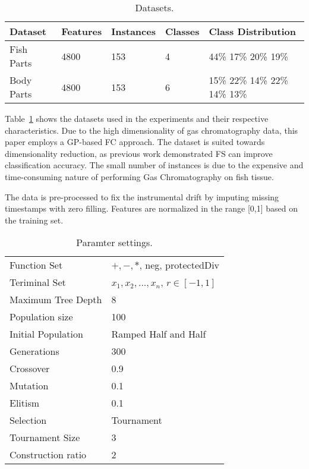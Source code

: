 \documentclass[runningheads]{llncs}
\begin{document}
\begin{table}
  \caption{Datasets.}
  \centering 
  \begin{tabular}{ l l l l l }
    \hline 
    Dataset & Features & Instances & Classes & Class Distribution \\ 
    \hline 
    Fish Parts & 4800 & 153 & 4 & 44\% 17\% 20\% 19\% \\ 
    Body Parts & 4800 & 153 & 6 & 15\% 22\% 14\% 22\% 14\% 13\% \\
    \hline 
  \end{tabular}
  \label{tab:datasets}
\end{table}

Table~\ref{tab:datasets} shows the datasets used in the experiments and their respective characteristics.
Due to the high dimensionality of gas chromatography data, this paper employs a GP-based FC approach.
The dataset is suited towards dimensionality reduction, as previous work \cite{long2022ai} demonstrated FS can improve classification accuracy.
The small number of instances is due to the expensive and time-consuming nature of performing Gas Chromatography on fish tissue.

The data is pre-processed to fix the instrumental drift by imputing missing timestamps with zero filling.
Features are normalized in the range [0,1] based on the training set. 

\begin{table}
  \caption{Paramter settings.}
  \centering 
  \begin{tabular}{ l l }
  \hline 
  Function Set & $+,-,*$, neg, protectedDiv \\ 
  Teriminal Set & $x_1, x_2, ..., x_n$, $r \in [-1,1]$ \\
  Maximum Tree Depth & 8 \\ 
  Population size & 100 \\ 
  Initial Population & Ramped Half and Half \\ 
  Generations & 300 \\ 
  Crossover & 0.9 \\ 
  Mutation & 0.1 \\ 
  Elitism & 0.1 \\ 
  Selection & Tournament \\ 
  Tournament Size & 3 \\ 
  Construction ratio & 2 \\ 
  \hline 
  \end{tabular}
  \label{tab:parameters}
\end{table}
\end{document}
